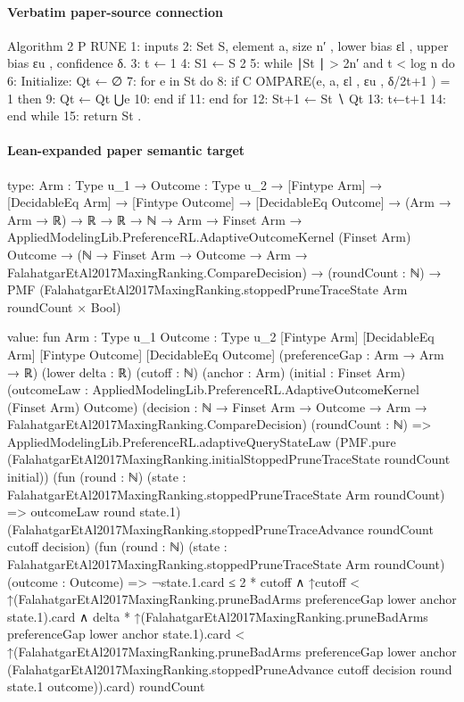 \documentclass[10pt]{article}
\begin{document}
\paragraph{Verbatim paper-source connection}
\begin{ReviewVerbatim}
Algorithm 2 P RUNE
 1: inputs
 2:   Set S, element a, size n′ , lower bias εl , upper bias εu , confidence δ.
 3: t ← 1
 4: S1 ← S
                                   2
 5: while ∣St ∣ > 2n′ and t < log n do
 6:   Initialize: Qt ← ∅
 7:   for e in St do
 8:      if C OMPARE(e, a, εl , εu , δ/2t+1 ) = 1 then
 9:         Qt ← Qt ⋃{e}
10:      end if
11:   end for
12:   St+1 ← St ∖ Qt
13:   t←t+1
14: end while
15: return St .
\end{ReviewVerbatim}



\paragraph{Lean-expanded paper semantic target}
\begin{ReviewVerbatim}
type:
{Arm : Type u_1} →
  {Outcome : Type u_2} →
    [Fintype Arm] →
      [DecidableEq Arm] →
        [Fintype Outcome] →
          [DecidableEq Outcome] →
            (Arm → Arm → ℝ) →
              ℝ →
                ℝ →
                  ℕ →
                    Arm →
                      Finset Arm →
                        AppliedModelingLib.PreferenceRL.AdaptiveOutcomeKernel (Finset Arm) Outcome →
                          (ℕ → Finset Arm → Outcome → Arm → FalahatgarEtAl2017MaxingRanking.CompareDecision) →
                            (roundCount : ℕ) →
                              PMF (FalahatgarEtAl2017MaxingRanking.stoppedPruneTraceState Arm roundCount × Bool)

value:
fun {Arm : Type u_1} {Outcome : Type u_2} [Fintype Arm] [DecidableEq Arm] [Fintype Outcome] [DecidableEq Outcome]
    (preferenceGap : Arm → Arm → ℝ) (lower delta : ℝ) (cutoff : ℕ) (anchor : Arm) (initial : Finset Arm)
    (outcomeLaw : AppliedModelingLib.PreferenceRL.AdaptiveOutcomeKernel (Finset Arm) Outcome)
    (decision : ℕ → Finset Arm → Outcome → Arm → FalahatgarEtAl2017MaxingRanking.CompareDecision) (roundCount : ℕ) =>
  AppliedModelingLib.PreferenceRL.adaptiveQueryStateLaw
    (PMF.pure (FalahatgarEtAl2017MaxingRanking.initialStoppedPruneTraceState roundCount initial))
    (fun (round : ℕ) (state : FalahatgarEtAl2017MaxingRanking.stoppedPruneTraceState Arm roundCount) =>
      outcomeLaw round state.1)
    (FalahatgarEtAl2017MaxingRanking.stoppedPruneTraceAdvance roundCount cutoff decision)
    (fun (round : ℕ) (state : FalahatgarEtAl2017MaxingRanking.stoppedPruneTraceState Arm roundCount)
        (outcome : Outcome) =>
      ¬state.1.card ≤ 2 * cutoff ∧
        ↑cutoff < ↑(FalahatgarEtAl2017MaxingRanking.pruneBadArms preferenceGap lower anchor state.1).card ∧
          delta * ↑(FalahatgarEtAl2017MaxingRanking.pruneBadArms preferenceGap lower anchor state.1).card <
            ↑(FalahatgarEtAl2017MaxingRanking.pruneBadArms preferenceGap lower anchor
                  (FalahatgarEtAl2017MaxingRanking.stoppedPruneAdvance cutoff decision round state.1 outcome)).card)
    roundCount
\end{ReviewVerbatim}
\end{document}
